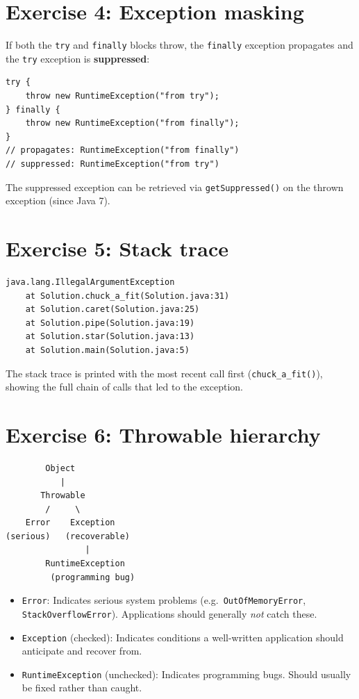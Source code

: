 \documentclass[twoside=false,DIV=14]{scrartcl}
\begin{document}
\section*{Exercise 4: Exception masking}

If both the \texttt{try} and \texttt{finally} blocks throw, the \texttt{finally} exception propagates and the \texttt{try} exception is \textbf{suppressed}:

\begin{lstlisting}
try {
    throw new RuntimeException("from try");
} finally {
    throw new RuntimeException("from finally");
}
// propagates: RuntimeException("from finally")
// suppressed: RuntimeException("from try")
\end{lstlisting}

The suppressed exception can be retrieved via \texttt{getSuppressed()} on the thrown exception (since Java 7).

\section*{Exercise 5: Stack trace}

\begin{lstlisting}
java.lang.IllegalArgumentException
    at Solution.chuck_a_fit(Solution.java:31)
    at Solution.caret(Solution.java:25)
    at Solution.pipe(Solution.java:19)
    at Solution.star(Solution.java:13)
    at Solution.main(Solution.java:5)
\end{lstlisting}

The stack trace is printed with the most recent call first (\texttt{chuck\_a\_fit()}), showing the full chain of calls that led to the exception.

\section*{Exercise 6: Throwable hierarchy}

\begin{verbatim}
        Object
           |
       Throwable
        /     \
    Error    Exception
(serious)   (recoverable)
                |
        RuntimeException
         (programming bug)
\end{verbatim}

\begin{itemize}
\item \texttt{Error}: Indicates serious system problems (e.g.\ \texttt{OutOfMemoryError}, \texttt{StackOverflowError}).  Applications should generally \emph{not} catch these.
\item \texttt{Exception} (checked): Indicates conditions a well-written application should anticipate and recover from.
\item \texttt{RuntimeException} (unchecked): Indicates programming bugs.  Should usually be fixed rather than caught.
\end{itemize}
\end{document}
